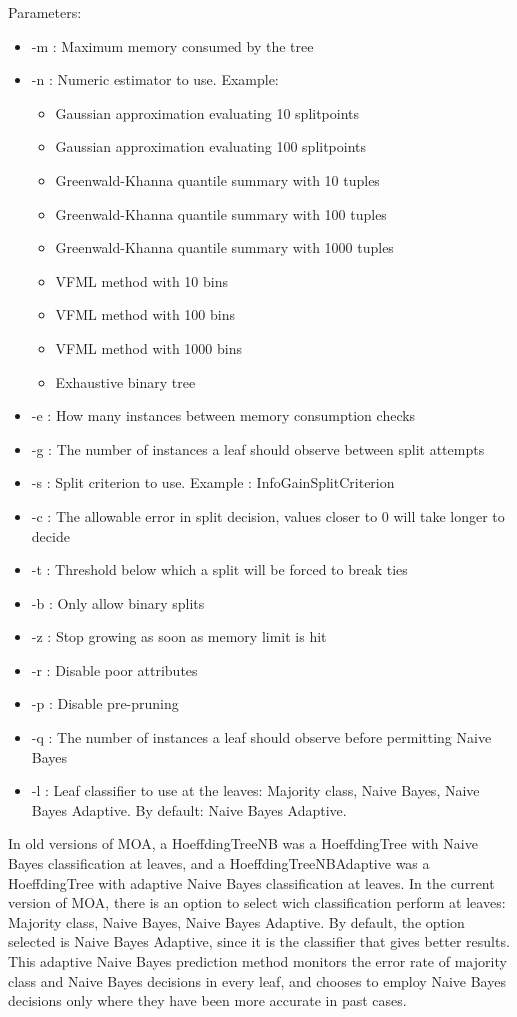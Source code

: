 \documentclass[a4paper,12pt,twoside]{book}
\begin{document}
 

Parameters:
\begin{itemize}
\item -m : Maximum memory consumed by the tree
\item -n : Numeric estimator to use. Example:
\begin{itemize}
\item Gaussian approximation evaluating 10 splitpoints
\item Gaussian approximation evaluating 100 splitpoints
\item Greenwald-Khanna quantile summary with 10 tuples
\item Greenwald-Khanna quantile summary with 100 tuples
\item Greenwald-Khanna quantile summary with 1000 tuples
\item VFML method with 10 bins
\item VFML method with 100 bins
\item VFML method with 1000 bins 
\item Exhaustive binary tree
\end{itemize}
\item -e : How many instances between memory consumption checks
\item -g : The number of instances a leaf should observe between split attempts
\item -s : Split criterion to use. Example : InfoGainSplitCriterion
\item -c : The allowable error in split decision, values closer to 0 will take longer to decide
\item -t : Threshold below which a split will be forced to break ties
\item -b : Only allow binary splits
\item -z : Stop growing as soon as memory limit is hit
\item -r : Disable poor attributes
\item -p : Disable pre-pruning
\item -q : The number of instances a leaf should observe before permitting Naive Bayes
\item -l : Leaf classifier to use at the leaves: Majority class, Naive Bayes, Naive Bayes Adaptive.
By default: Naive Bayes Adaptive.
\end{itemize}

In old versions of MOA, a HoeffdingTreeNB was a HoeffdingTree with Naive Bayes classification at leaves,
and a HoeffdingTreeNBAdaptive was a HoeffdingTree with adaptive Naive Bayes classification at leaves.
In the current version of MOA, there is an option to select wich classification perform at leaves: 
Majority class, Naive Bayes, Naive Bayes Adaptive. By default, the option selected is 
Naive Bayes Adaptive, since it is the classifier that gives better results.
This adaptive Naive Bayes prediction method monitors
the error rate of majority class and Naive Bayes decisions in every
leaf, and chooses to employ Naive Bayes decisions only where they have been
more accurate in past cases.
\end{document}
